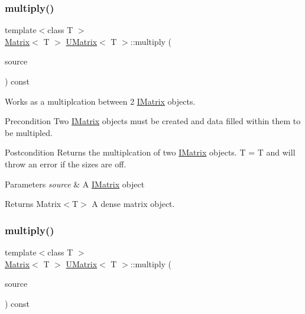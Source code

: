 \subsubsection{\texorpdfstring{multiply()}{multiply()}\hspace{0.1cm}{\footnotesize\ttfamily [2/6]}}
{\footnotesize\ttfamily template$<$class T $>$ \\
\mbox{\hyperlink{class_matrix}{Matrix}}$<$ T $>$ \mbox{\hyperlink{class_u_matrix}{U\+Matrix}}$<$ T $>$\+::multiply (\begin{DoxyParamCaption}\item[{const \mbox{\hyperlink{class_i_matrix}{I\+Matrix}}$<$ \mbox{\hyperlink{class_t_matrix}{T\+Matrix}}$<$ T $>$, T $>$ \&}]{source }\end{DoxyParamCaption}) const}



Works as a multiplcation between 2 \mbox{\hyperlink{class_i_matrix}{I\+Matrix}} objects. 

\begin{DoxyPrecond}{Precondition}
Two \mbox{\hyperlink{class_i_matrix}{I\+Matrix}} objects must be created and data filled within them to be multipled. 
\end{DoxyPrecond}
\begin{DoxyPostcond}{Postcondition}
Returns the multiplcation of two \mbox{\hyperlink{class_i_matrix}{I\+Matrix}} objects. T = T and will throw an error if the sizes are off.
\end{DoxyPostcond}

\begin{DoxyParams}{Parameters}
{\em source} & A \mbox{\hyperlink{class_i_matrix}{I\+Matrix}} object \\
\hline
\end{DoxyParams}
\begin{DoxyReturn}{Returns}
Matrix$<$\+T$>$ A dense matrix object. 
\end{DoxyReturn}
\mbox{\label{class_u_matrix_a8409112f00cc0220a5ce04ec16b99977}} 
\subsubsection{\texorpdfstring{multiply()}{multiply()}\hspace{0.1cm}{\footnotesize\ttfamily [3/6]}}
{\footnotesize\ttfamily template$<$class T $>$ \\
\mbox{\hyperlink{class_matrix}{Matrix}}$<$ T $>$ \mbox{\hyperlink{class_u_matrix}{U\+Matrix}}$<$ T $>$\+::multiply (\begin{DoxyParamCaption}\item[{const \mbox{\hyperlink{class_i_matrix}{I\+Matrix}}$<$ \mbox{\hyperlink{class_l_matrix}{L\+Matrix}}$<$ T $>$, T $>$ \&}]{source }\end{DoxyParamCaption}) const}



